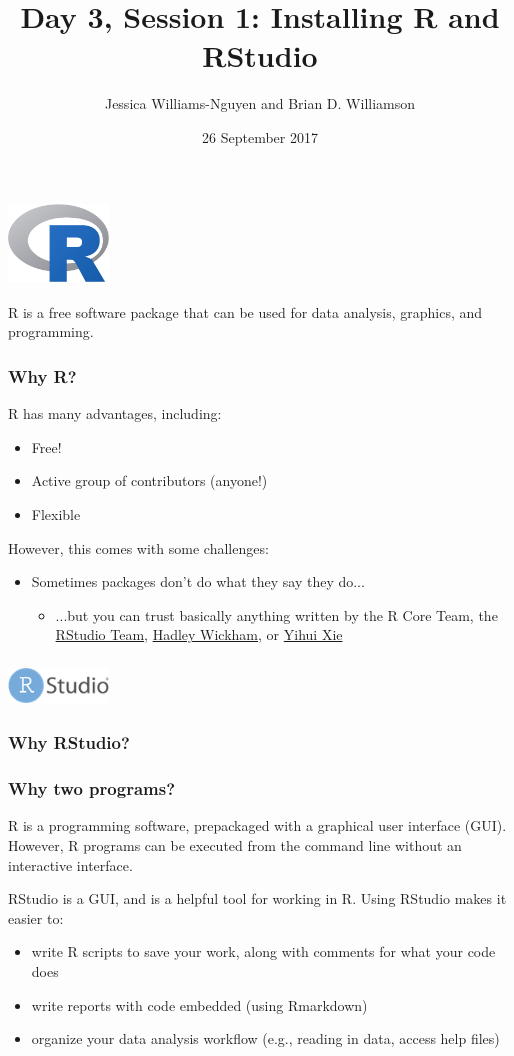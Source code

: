\documentclass[12pt]{beamer}
\title{Day 3, Session 1: Installing R and RStudio}
\author{Jessica Williams-Nguyen and Brian D. Williamson}
\institute{EPI/BIOST Bootcamp 2017}
\date{26 September 2017}
\newcommand{\myframe}[1]{\begin{frame} \frametitle{#1}}
\newenvironment{spaceitemize}
{ \begin{itemize}
    \setlength{\itemsep}{10pt}
    \setlength{\parskip}{0pt}
    \setlength{\parsep}{0pt}     }
{ \end{itemize}                  }
\begin{document}
\begin{frame}
\titlepage
\end{frame}

\myframe{\includegraphics[width = 0.2\textwidth]{../Rlogo.png}}
R is a free software package that can be used for data analysis, graphics, and programming. 
\end{frame}

\myframe{Why R?}
R has many advantages, including:
\begin{spaceitemize}
\item Free!
\item Active group of contributors (anyone!)
\item Flexible
\end{spaceitemize}

However, this comes with some challenges:
\begin{spaceitemize}
\item Sometimes packages don't do what they say they do...
\begin{itemize}
\item ...but you can trust basically anything written by the R Core Team, the \href{https://www.rstudio.com/products/rpackages/}{RStudio Team}, \href{http://hadley.nz/}{Hadley Wickham}, or \href{https://github.com/yihui}{Yihui Xie}
\end{itemize}
\end{spaceitemize}
\end{frame}


\myframe{\includegraphics[width = 0.2\textwidth]{../RStudiologo.png}}
\end{frame}

\myframe{Why RStudio?}

\end{frame}


\myframe{Why two programs?}
R is a programming software, prepackaged with a graphical user interface (GUI). However, R programs can be executed from the command line without an interactive interface.

RStudio is a GUI, and is a helpful tool for working in R. Using RStudio makes it easier to:
\begin{spaceitemize}
\item write R scripts to save your work, along with comments for what your code does
\item write reports with code embedded (using Rmarkdown)
\item organize your data analysis workflow (e.g., reading in data, access help files)
\end{spaceitemize}
\end{frame}
\end{document}
